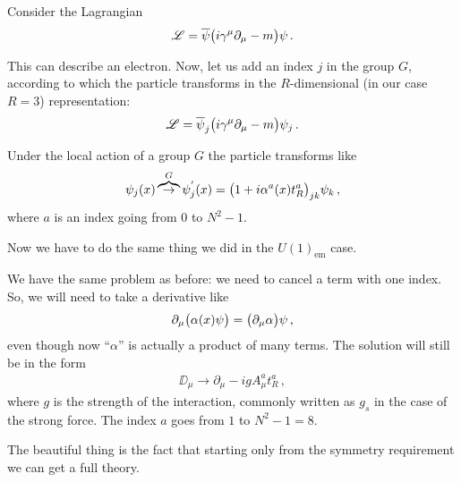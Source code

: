 \documentclass[main.tex]{subfiles}
\begin{document}
Consider the Lagrangian 
%
\begin{align}
\mathscr{L} = \overline{\psi} \qty(i \gamma^{\mu } \partial_{\mu } - m ) \psi 
\,.
\end{align}

This can describe an electron. Now, let us add an index \(j\) in the group \(G\), according to which the particle transforms in the \(R\)-dimensional (in our case \(R=3\)) representation:
\begin{align}
\mathscr{L} = \overline{\psi}_{j} \qty(i \gamma^{\mu } \partial_{\mu } - m ) \psi_{j}
\,.
\end{align}

Under the local action of a group \(G\) the particle transforms like 
%
\begin{align}
\psi_{j} (x) \overbrace{\to}^{G} 
\psi^{'}_{j} (x)
= \qty(1 + i \alpha^{a}(x) t^{a}_{R})_{jk} \psi_{k} 
\,,
\end{align}
%
where \(a\) is an index going from 0 to \(N^2-1\). 

Now we have to do the same thing we did in the \(U(1)_{\text{em}}\) case. 

We have the same problem as before: we need to cancel a term with one index. So, we will need to take a derivative like 
%
\begin{align}
\partial_{\mu } \qty(\alpha (x) \psi ) = \qty(\partial_{\mu } \alpha ) \psi  
\,,
\end{align}
%
even though now ``\(\alpha \)'' is actually a product of many terms. The solution will still be in the form 
%
\begin{align}
\DD_{\mu } \to \partial_{\mu } - i g A_{\mu }^{a} t^{a}_{R}
\,,
\end{align}
%
where \(g\) is the strength of the interaction, commonly written as \(g_{s}\) in the case of the strong force. 
The index \(a\) goes from \(1\) to \(N^2-1 = 8\). 

The beautiful thing is the fact that starting only from the symmetry requirement we can get a full theory. 
\end{document}
